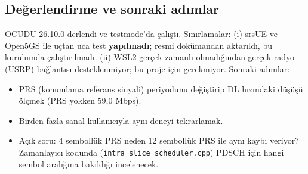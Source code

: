 \subsection*{Değerlendirme ve sonraki adımlar}
OCUDU 26.10.0 derlendi ve testmode'da çalıştı. Sınırlamalar: (i) srsUE ve Open5GS ile uçtan uca test \textbf{yapılmadı}; resmi dokümandan aktarıldı, bu kurulumda çalıştırılmadı. (ii) WSL2 gerçek zamanlı olmadığından gerçek radyo (USRP) bağlantısı desteklenmiyor; bu proje için gerekmiyor. Sonraki adımlar:
\begin{itemize}
\item PRS (konumlama referans sinyali) periyodunu değiştirip DL hızındaki düşüşü ölçmek (PRS yokken 59,0 Mbps).
\item Birden fazla sanal kullanıcıyla aynı deneyi tekrarlamak.
\item Açık soru: 4 sembollük PRS neden 12 sembollük PRS ile aynı kaybı veriyor? Zamanlayıcı kodunda (\texttt{intra\_slice\_scheduler.cpp}) PDSCH için hangi sembol aralığına bakıldığı incelenecek.
\end{itemize}
